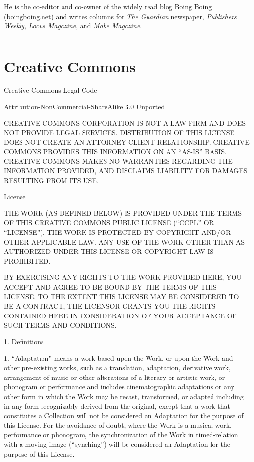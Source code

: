 He is the co-editor and co-owner of the widely read blog Boing
Boing (boingboing.net) and writes columns for \emph{The Guardian}
newspaper, \emph{Publishers Weekly}, \emph{Locus Magazine}, and
\emph{Make Magazine}.

\begin{center}\rule{3in}{0.4pt}\end{center}

\section{Creative Commons}

Creative Commons Legal Code

Attribution-NonCommercial-ShareAlike 3.0 Unported

CREATIVE COMMONS CORPORATION IS NOT A LAW FIRM AND DOES NOT PROVIDE
LEGAL SERVICES. DISTRIBUTION OF THIS LICENSE DOES NOT CREATE AN
ATTORNEY-CLIENT RELATIONSHIP. CREATIVE COMMONS PROVIDES THIS
INFORMATION ON AN ``AS-IS'' BASIS. CREATIVE COMMONS MAKES NO
WARRANTIES REGARDING THE INFORMATION PROVIDED, AND DISCLAIMS
LIABILITY FOR DAMAGES RESULTING FROM ITS USE.

License

THE WORK (AS DEFINED BELOW) IS PROVIDED UNDER THE TERMS OF THIS
CREATIVE COMMONS PUBLIC LICENSE (``CCPL'' OR ``LICENSE''). THE WORK IS
PROTECTED BY COPYRIGHT AND/OR OTHER APPLICABLE LAW. ANY USE OF THE
WORK OTHER THAN AS AUTHORIZED UNDER THIS LICENSE OR COPYRIGHT LAW
IS PROHIBITED.

BY EXERCISING ANY RIGHTS TO THE WORK PROVIDED HERE, YOU ACCEPT AND
AGREE TO BE BOUND BY THE TERMS OF THIS LICENSE. TO THE EXTENT THIS
LICENSE MAY BE CONSIDERED TO BE A CONTRACT, THE LICENSOR GRANTS YOU
THE RIGHTS CONTAINED HERE IN CONSIDERATION OF YOUR ACCEPTANCE OF
SUCH TERMS AND CONDITIONS.

1. Definitions

1. ``Adaptation'' means a work based upon the Work, or upon the Work
and other pre-existing works, such as a translation, adaptation,
derivative work, arrangement of music or other alterations of a
literary or artistic work, or phonogram or performance and includes
cinematographic adaptations or any other form in which the Work may
be recast, transformed, or adapted including in any form
recognizably derived from the original, except that a work that
constitutes a Collection will not be considered an Adaptation for
the purpose of this License. For the avoidance of doubt, where the
Work is a musical work, performance or phonogram, the
synchronization of the Work in timed-relation with a moving image
(``synching'') will be considered an Adaptation for the purpose of
this License.

